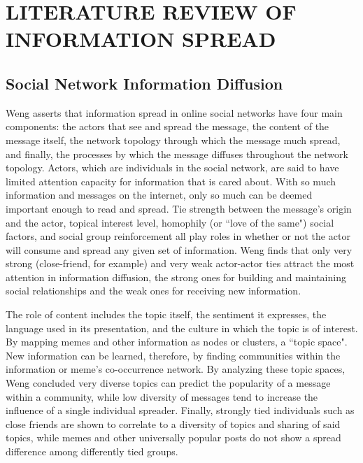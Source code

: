 \chapter{LITERATURE REVIEW OF INFORMATION SPREAD}%

\section{Social Network Information Diffusion}
Weng asserts that information spread in online social networks have four main components: the actors that see and spread the message, the content of the message itself, the network topology through which the message much spread, and finally, the processes by which the message diffuses throughout the network topology.
Actors, which are individuals in the social network, are said to have limited attention capacity for information that is cared about. With so much information and messages on the internet, only so much can be deemed important enough to read and spread. Tie strength between the message's origin and the actor, topical interest level, homophily (or ``love of the same") social factors, and social group reinforcement all play roles in whether or not the actor will consume and spread any given set of information. Weng finds that only very strong (close-friend, for example) and very weak actor-actor ties attract the most attention in information diffusion, the strong ones for building and maintaining social relationships and the weak ones for receiving new information.

The role of content includes the topic itself, the sentiment it expresses, the language used in its presentation, and the culture in which the topic is of interest. By mapping memes and other information as nodes or clusters, a ``topic space". New information can be learned, therefore, by finding communities within the information or meme's co-occurrence network. By analyzing these topic spaces, Weng concluded very diverse topics can predict the popularity of a message within a community, while low diversity of messages tend to increase the influence of a single individual spreader. Finally, strongly tied individuals such as close friends are shown to correlate to a diversity of topics and sharing of said topics, while memes and other universally popular posts do not show a spread difference among differently tied groups.


